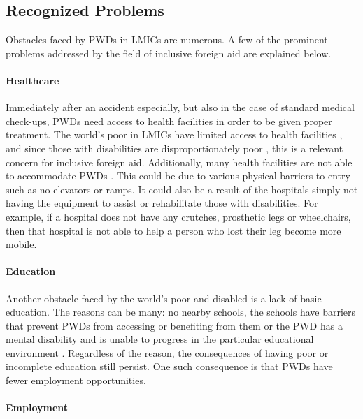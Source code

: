 \documentclass[a4paper]{article}
\begin{document}
\subsection{Recognized Problems}

Obstacles faced by PWDs in LMICs are numerous. A few of the prominent problems
addressed by the field of inclusive foreign aid are explained below.

\paragraph{Healthcare}

Immediately after an accident especially, but also in the case of standard
medical check-ups, PWDs need access to health facilities in order to be given
proper treatment. The world's poor in LMICs have limited access to health
facilities \citep{peters2008poverty}, and since those with disabilities are
disproportionately poor \citep{mitra2018disability}, this is a relevant
concern for inclusive foreign aid. Additionally, many health facilities are
not able to accommodate PWDs \citep{drainoni2006cross}. This could be due to
various physical barriers to entry such as no elevators or ramps. It could
also be a result of the hospitals simply not having the equipment to assist or
rehabilitate those with disabilities. For example, if a hospital does not have
any crutches, prosthetic legs or wheelchairs, then that hospital is not able
to help a person who lost their leg become more mobile.

\paragraph{Education}

Another obstacle faced by the world’s poor and disabled is a lack of basic
education. The reasons can be many: no nearby schools, the schools have
barriers that prevent PWDs from accessing or benefiting from them or the PWD
has a mental disability and is unable to progress in the particular
educational environment \citep{ingstad2011disability}. Regardless of the
reason, the consequences of having poor or incomplete education still persist.
One such consequence is that PWDs have fewer employment opportunities.

\paragraph{Employment}
\end{document}
